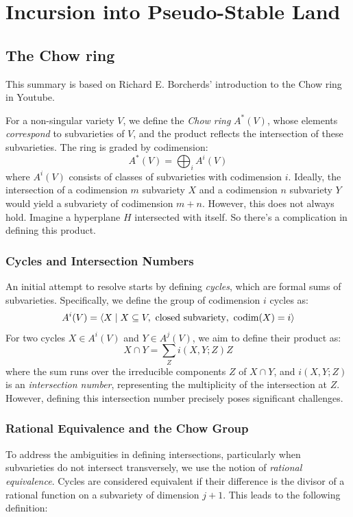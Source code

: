 \documentclass[12pt]{memoir}
\begin{document}
\chapter{Incursion into Pseudo-Stable Land}

\section{The Chow ring}

This summary is based on Richard E. Borcherds' introduction to the Chow ring in Youtube.

For a non-singular variety \( V \), we define the \emph{Chow ring} \( A^\ast(V) \), whose elements \emph{correspond} to subvarieties of \( V \), and the product reflects the intersection of these subvarieties. The ring is graded by codimension:
\[
A^\ast(V) = \bigoplus_i A^i(V)
\]
where \( A^i(V) \) consists of classes of subvarieties with codimension \( i \). Ideally, the intersection of a codimension \( m \) subvariety \( X \) and a codimension \( n \) subvariety \( Y \) would yield a subvariety of codimension \( m+n \). However, this does not always hold. Imagine a hyperplane $H$ intersected with itself. So there's a complication in defining this product.

\subsection{Cycles and Intersection Numbers}

An initial attempt to resolve starts by defining \emph{cycles}, which are formal sums of subvarieties. Specifically, we define the group of codimension \( i \) cycles as:
\[
A^i(V) = \left\langle X \mid X \subseteq V, \ \text{closed subvariety}, \ \codim(X) = i \right\rangle
\]
For two cycles \( X \in A^i(V) \) and \( Y \in A^j(V) \), we aim to define their product as:
\[
X \cap Y = \sum_{Z} i(X, Y; Z) Z
\]
where the sum runs over the irreducible components \( Z\) of \( X \cap Y \), and \( i(X, Y; Z) \) is an \emph{intersection number}, representing the multiplicity of the intersection at \( Z \). However, defining this intersection number precisely poses significant challenges.

\subsection{Rational Equivalence and the Chow Group}

To address the ambiguities in defining intersections, particularly when subvarieties do not intersect transversely, we use the notion of \emph{rational equivalence}. Cycles are considered equivalent if their difference is the divisor of a rational function on a subvariety of dimension \( j+1 \). This leads to the following definition:
\end{document}
